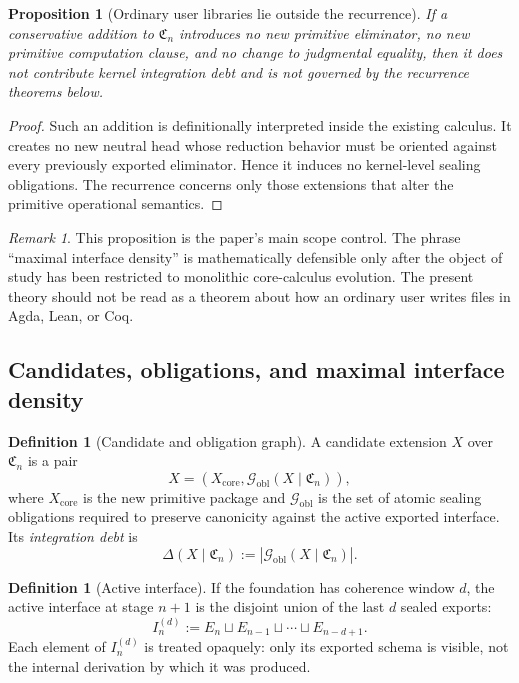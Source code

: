 \documentclass{lmcs}
\theoremstyle{plain}
\newtheorem{prop}[thm]{Proposition}
\theoremstyle{definition}
\newtheorem{defi}[thm]{Definition}
\theoremstyle{remark}
\newtheorem{rem}[thm]{Remark}
\newcommand{\Core}{\ensuremath{\mathfrak{C}}}
\begin{document}
\begin{prop}[Ordinary user libraries lie outside the recurrence]
\label{prop:not-user-library}
If a conservative addition to $\Core_n$ introduces no new primitive eliminator, no new primitive computation clause, and no change to judgmental equality, then it does not contribute kernel integration debt and is not governed by the recurrence theorems below.
\end{prop}

\begin{proof}
Such an addition is definitionally interpreted inside the existing calculus.
It creates no new neutral head whose reduction behavior must be oriented against every previously exported eliminator.
Hence it induces no kernel-level sealing obligations.
The recurrence concerns only those extensions that alter the primitive operational semantics.
\end{proof}

\begin{rem}
This proposition is the paper's main scope control.
The phrase ``maximal interface density'' is mathematically defensible only after the object of study has been restricted to monolithic core-calculus evolution.
The present theory should not be read as a theorem about how an ordinary user writes files in Agda, Lean, or Coq.
\end{rem}

\subsection{Candidates, obligations, and maximal interface density}

\begin{defi}[Candidate and obligation graph]
A candidate extension $X$ over $\Core_n$ is a pair
\[
  X = (X_{\mathrm{core}},\mathcal{G}_{\mathrm{obl}}(X \mid \Core_n)),
\]
where $X_{\mathrm{core}}$ is the new primitive package and $\mathcal{G}_{\mathrm{obl}}$ is the set of atomic sealing obligations required to preserve canonicity against the active exported interface.
Its \emph{integration debt} is
\[
  \Delta(X \mid \Core_n) := |\mathcal{G}_{\mathrm{obl}}(X \mid \Core_n)|.
\]
\end{defi}

\begin{defi}[Active interface]
If the foundation has coherence window $d$, the active interface at stage $n+1$ is the disjoint union of the last $d$ sealed exports:
\[
  I_n^{(d)} := E_n \sqcup E_{n-1} \sqcup \cdots \sqcup E_{n-d+1}.
\]
Each element of $I_n^{(d)}$ is treated opaquely: only its exported schema is visible, not the internal derivation by which it was produced.
\end{defi}
\end{document}

